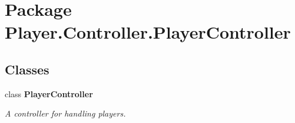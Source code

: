 \section{Package Player.\-Controller.\-Player\-Controller}
\label{namespace_player_1_1_controller_1_1_player_controller}
\subsection*{Classes}
\begin{DoxyCompactItemize}
\item 
class {\bf Player\-Controller}
\begin{DoxyCompactList}\small\item\em A controller for handling players. \end{DoxyCompactList}\end{DoxyCompactItemize}
